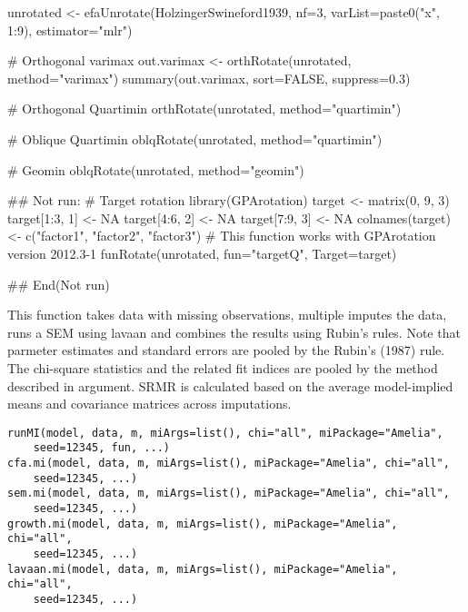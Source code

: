 \documentclass[a4paper]{book}
\begin{document}
%
\begin{Examples}
\begin{ExampleCode}
unrotated <- efaUnrotate(HolzingerSwineford1939, nf=3, varList=paste0("x", 1:9), estimator="mlr")

# Orthogonal varimax
out.varimax <- orthRotate(unrotated, method="varimax")
summary(out.varimax, sort=FALSE, suppress=0.3)

# Orthogonal Quartimin
orthRotate(unrotated, method="quartimin")

# Oblique Quartimin
oblqRotate(unrotated, method="quartimin")

# Geomin
oblqRotate(unrotated, method="geomin")

## Not run: 
# Target rotation
library(GPArotation)
target <- matrix(0, 9, 3)
target[1:3, 1] <- NA
target[4:6, 2] <- NA
target[7:9, 3] <- NA
colnames(target) <- c("factor1", "factor2", "factor3")
# This function works with GPArotation version 2012.3-1
funRotate(unrotated, fun="targetQ", Target=target) 

## End(Not run)
\end{ExampleCode}
\end{Examples}
%
\begin{Description}\relax
This function takes data with missing observations, multiple imputes the data, runs a SEM using lavaan and combines the results using Rubin's rules. Note that parmeter estimates and standard errors are pooled by the Rubin's (1987) rule. The chi-square statistics and the related fit indices are pooled by the method described in  argument. SRMR is calculated based on the average model-implied means and covariance matrices across imputations.
\end{Description}
%
\begin{Usage}
\begin{verbatim}
runMI(model, data, m, miArgs=list(), chi="all", miPackage="Amelia", 
	seed=12345, fun, ...) 
cfa.mi(model, data, m, miArgs=list(), miPackage="Amelia", chi="all", 
	seed=12345, ...)
sem.mi(model, data, m, miArgs=list(), miPackage="Amelia", chi="all",  
	seed=12345, ...)
growth.mi(model, data, m, miArgs=list(), miPackage="Amelia", chi="all", 
	seed=12345, ...)
lavaan.mi(model, data, m, miArgs=list(), miPackage="Amelia", chi="all", 
	seed=12345, ...)
\end{verbatim}
\end{Usage}
\end{document}
